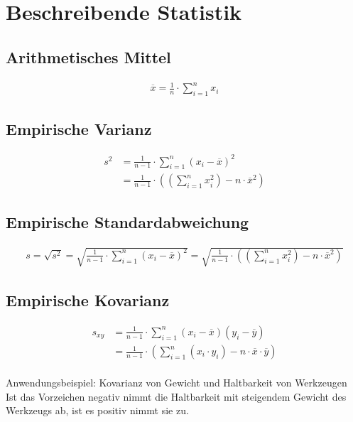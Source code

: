 \section{Beschreibende Statistik}

\subsection{Arithmetisches Mittel}
\begin{align*}
\overline{x} = \frac{1}{n} \cdot \sum_{i=1}^{n} x_i
\end{align*}

\subsection{Empirische Varianz}
\begin{align*}
	s^2 &= \frac{1}{n-1} \cdot \sum_{i=1}^{n} \left(x_i - \overline{x}\right)^2\\
	    &= \frac{1}{n-1} \cdot \left(\left(\sum_{i=1}^{n} x_i^2 \right) - n \cdot \overline{x}^2\right)
\end{align*}

\subsection{Empirische Standardabweichung}
\begin{align*}
	s = \sqrt{s^2} = \sqrt{\frac{1}{n-1} \cdot \sum_{i=1}^{n} (x_i - \overline{x})^2} = \sqrt{\frac{1}{n-1} \cdot ((\sum_{i=1}^{n} x_i^2) - n \cdot \overline{x}^2)}
\end{align*}

\subsection{Empirische Kovarianz}
\begin{align*}
	s_{xy} &= \frac{1}{n-1} \cdot \sum_{i=1}^{n} (x_i-\overline{x})(y_i-\overline{y})\\
	&= \frac{1}{n-1} \cdot \left(\sum_{i=1}^{n} (x_i \cdot y_i) - n \cdot \overline{x} \cdot \overline{y}\right)\\
\end{align*}

Anwendungsbeispiel: Kovarianz von Gewicht und Haltbarkeit von Werkzeugen\\
Ist das Vorzeichen negativ nimmt die Haltbarkeit mit steigendem Gewicht des Werkzeugs ab, ist es positiv nimmt sie zu.

